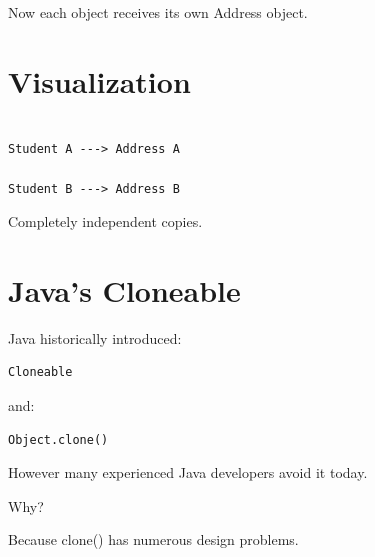 \documentclass[11pt,a4paper]{book}
\begin{document}

Now each object receives its
own Address object.


\section{Visualization}

\begin{verbatim}

Student A ---> Address A

Student B ---> Address B

\end{verbatim}


Completely independent copies.


\section{Java's Cloneable}

Java historically introduced:

\begin{verbatim}
Cloneable
\end{verbatim}

and:

\begin{verbatim}
Object.clone()
\end{verbatim}


However many experienced Java
developers avoid it today.


Why?


Because clone() has numerous
design problems.

\end{document}
